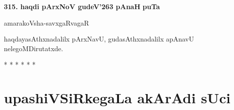 \medskip
\noindent
\textbf{315. haqdi pArxNoV gudeV\char'263 pAnaH} \hfill {\bf puTa }

\hfill amarakoVsha-savxgaRvagaR

\smallskip
haqdayasAthxnadalilx pArxNavU, gudasAthxnadalilx apAnavU nelegoMDirutatxde.

\begin{center}
* * * * * *
\end{center}

\chapter*{upashiVSiRkegaLa akArAdi sUci} 



